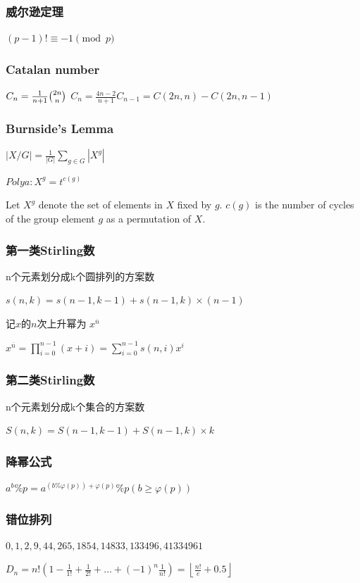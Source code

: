 \documentclass[UTF8,a4paper,titlepage]{ctexart}
\begin{document}
\subsubsection*{威尔逊定理}
$(p-1)!\equiv -1\pmod{p}$
\subsubsection*{Catalan number}
$C_n=\frac{1}{n+1}\tbinom{2n}{n}$\qquad
$C_n=\frac{4n-2}{n+1}C_{n-1}=C(2n,n)-C(2n,n-1)$

\subsubsection*{Burnside’s Lemma}
$\left|X/G\right|=\frac{1}{\left|G\right|}\sum_{g \in G}\left|X^g\right|$

$Polya: X^g=t^{c(g)}$

Let $X^g$ denote the set of elements in $X$ fixed by $g$.
$c(g)$ is the number of cycles of the group element $g$ as a permutation of $X$.

\subsubsection*{第一类Stirling数}
n个元素划分成k个圆排列的方案数

$s(n,k)=s(n-1,k-1)+s(n-1,k)\times(n-1)$

记$x$的$n$次上升幂为 $x^{\overline{n}}$

$x^{\overline{n}}=\prod_{i=0}^{n-1}(x+i)=\sum_{i=0}^{n-1}s(n,i)x^i$

\subsubsection*{第二类Stirling数}
n个元素划分成k个集合的方案数

$S(n,k)=S(n-1,k-1)+S(n-1,k) \times k$

\subsubsection*{降幂公式}
$a^b\%p=a^{(b\%\varphi(p))+\varphi(p)}\%p(b\geq\varphi(p))$
\subsubsection*{错位排列}
$0,1,2,9,44,265,1854,14833,133496,41334961$

$D_n=n!(1-\frac{1}{1!}+\frac{1}{2!}+\dots+(-1)^n\frac{1}{n!})=\left\lfloor {\frac  {n!}{e}}+0.5\right\rfloor$
\end{document}
